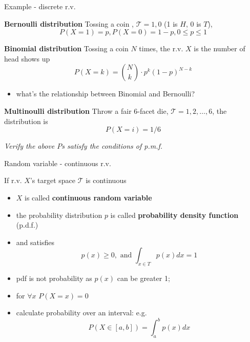 \documentclass[ignorenonframetext,]{beamer}
\providecommand{\tightlist}{%
  \setlength{\itemsep}{0pt}\setlength{\parskip}{0pt}}
\begin{document}
\begin{frame}{Example - discrete r.v.}
\protect\hypertarget{example---discrete-r.v.}{}

\textbf{Bernoulli distribution} Tossing a coin ,
\(\mathcal{T} = {1, 0}\) (1 is \(H\), 0 is \(T\)),
\[P(X=1) = p , P(X=0) = 1-p, 0\leq p\leq 1\]

\textbf{Binomial distribution} Tossing a coin \(N\) times, the r.v.
\(X\) is the number of head shows up
\[P(X=k) = \binom{N}{k} \cdot p^k(1-p)^{N-k}\]

\begin{itemize}
\item
  what's the relationship between Binomial and Bernoulli?

  \bigskip
\end{itemize}

\textbf{Multinoulli distribution} Throw a fair 6-facet die,
\(\mathcal{T} = {1, 2,\ldots, 6}\), the distribution is \[P(X=i) = 1/6\]

\emph{Verify the above \(P\)s satisfy the conditions of p.m.f.}

\end{frame}

\begin{frame}{Random variable - continuous r.v.}
\protect\hypertarget{random-variable---continuous-r.v.}{}

If r.v. \(X\)'s target space \(\mathcal{T}\) is continuous

\begin{itemize}
\tightlist
\item
  \(X\) is called \textbf{continuous random variable }
\item
  the probability distribution \(p\) is called \textbf{probability
  density function} (p.d.f.)
\item
  and satisfies \[p(x) \geq 0, \text{ and } \int_{x\in T} p(x) dx = 1\]
\item
  pdf is not probability as \(p(x)\) can be greater 1;
\item
  for \(\forall x\) \(P(X=x) =0\)\\
\item
  calculate probability over an interval: e.g.
  \[P(X \in [a,b]) = \int_{a}^b p(x) dx\]
\end{itemize}

\end{frame}
\end{document}
